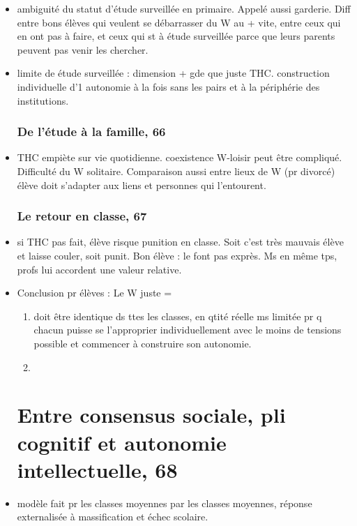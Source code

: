 \documentclass[12pt]{article}
\begin{document}
\begin{itemize}[label=]
\item ambiguité du statut d'étude surveillée en primaire.  Appelé aussi garderie. Diff entre bons élèves qui veulent se débarrasser du W au + vite, entre ceux qui en ont pas à faire, et ceux qui st à étude surveillée parce que leurs parents peuvent pas venir les chercher.\\

\item limite de étude surveillée : dimension + gde que juste THC. construction individuelle d'1 autonomie à la fois sans les pairs et à la périphérie des institutions. \\

\subsubsection{De l'étude à la famille, 66}

\item THC empiète sur vie quotidienne. coexistence W-loisir peut être compliqué. Difficulté du W solitaire. Comparaison aussi entre lieux de W (pr divorcé)  élève doit s'adapter aux liens et personnes qui l'entourent.


\subsubsection{Le retour en classe, 67}
\item si THC pas fait, élève risque punition en classe. Soit c'est très mauvais élève et laisse couler, soit punit. Bon élève : le font pas exprès. Ms en même tps, profs lui accordent une valeur relative.

\item Conclusion pr élèves : Le W juste =  
\begin{enumerate}
\item doit être identique ds ttes les classes, en qtité réelle ms limitée pr q chacun puisse se l'approprier individuellement avec le moins de tensions possible et commencer à construire son autonomie.
\item 
\end{enumerate}

\section{Entre consensus sociale, pli cognitif et autonomie intellectuelle, 68}

\item modèle fait pr les classes moyennes par les classes moyennes, réponse externalisée à massification et échec scolaire.\\


\end{itemize}
\end{document}

